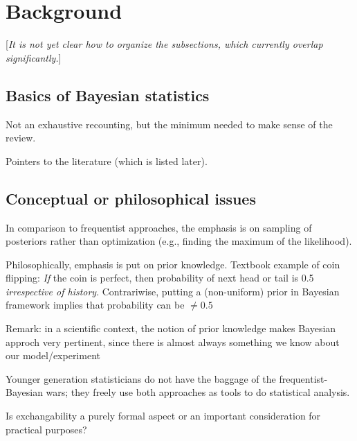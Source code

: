 \section{Background}  \label{sec:background}

[\emph{It is not yet clear how to organize the subsections, which currently overlap
  significantly.}]



\subsection{Basics of Bayesian statistics}  \label{subsec:basic_Bayes}

\bi
  \I Not an exhaustive recounting, but the minimum needed to make sense of
    the review.

  \I Pointers to the literature (which is listed later).
\ei


\subsection{Conceptual or philosophical issues} \label{subsec:conceptual_issues}

\bi
  \I In comparison to frequentist approaches, the emphasis is on sampling of posteriors
    rather than optimization (e.g., finding the maximum of the likelihood).

  \I Philosophically, emphasis is put on prior knowledge. Textbook example of coin flipping: 
     {\it If} the coin is perfect, then probability of next head or tail is 0.5 
     {\it irrespective of history}. Contrariwise, putting a (non-uniform) prior 
     in Bayesian framework implies that probability can be $\neq 0.5$

  \I Remark: in a scientific context, the notion of prior knowledge makes Bayesian approch
     very pertinent, since there is almost always something we know about our model/experiment
    
  \I Younger generation statisticians do not have the baggage of the frequentist-Bayesian wars;
    they freely use both approaches as tools to do statistical analysis. 

  \I Is exchangability a purely formal aspect or an important consideration for practical
    purposes? 
\ei


